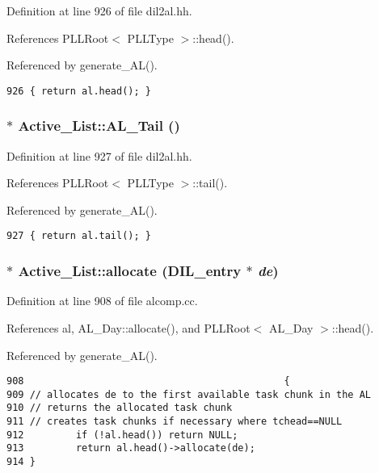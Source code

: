 Definition at line 926 of file dil2al.hh.

References PLLRoot$<$ PLLType $>$::head().

Referenced by generate\_\-AL().



\footnotesize\begin{verbatim}926 { return al.head(); }
\end{verbatim}\normalsize 
{}
\subsubsection{$\ast$ Active\_\-List::AL\_\-Tail ()\hspace{0.3cm}{\tt  [inline]}}\label{classActive__List_a8}




Definition at line 927 of file dil2al.hh.

References PLLRoot$<$ PLLType $>$::tail().

Referenced by generate\_\-AL().



\footnotesize\begin{verbatim}927 { return al.tail(); }
\end{verbatim}\normalsize 
{}
\subsubsection{ $\ast$ Active\_\-List::allocate ({\bf DIL\_\-entry} $\ast$ {\em de})}\label{classActive__List_a12}




Definition at line 908 of file alcomp.cc.

References al, AL\_\-Day::allocate(), and PLLRoot$<$ AL\_\-Day $>$::head().

Referenced by generate\_\-AL().



\footnotesize\begin{verbatim}908                                             {
909 // allocates de to the first available task chunk in the AL
910 // returns the allocated task chunk
911 // creates task chunks if necessary where tchead==NULL
912         if (!al.head()) return NULL;
913         return al.head()->allocate(de);
914 }
\end{verbatim}\normalsize 
{}
